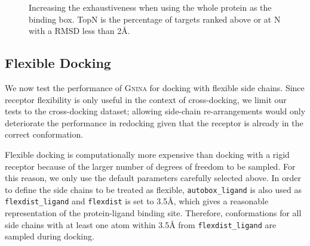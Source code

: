 \documentclass[linenumbers,doublespacing]{bmcart}
\begin{document}
\begin{figure}[tb]   
	\caption{Increasing the exhaustiveness when using the whole protein as the binding box. TopN is the percentage of targets ranked above or at N with a RMSD less than 2{\AA}.}
        \label{fig:WholeProteinExh}
\end{figure}

\subsection{Flexible Docking}

We now test the performance of \textsc{Gnina} for docking with flexible side chains. Since receptor flexibility is only useful in the context of cross-docking, we limit our tests to the cross-docking dataset; allowing side-chain re-arrangements would only deteriorate the performance in redocking given that the receptor is already in the correct conformation.

Flexible docking is computationally more expensive than docking with a rigid receptor because of the larger number of degrees of freedom to be sampled. For this reason, we only use the default parameters carefully selected above. In order to define the side chains to be treated as flexible, \texttt{autobox\_ligand} is also used as \texttt{flexdist\_ligand} and \texttt{flexdist} is set to 3.5{\AA}, which gives a reasonable representation of the protein-ligand binding site\cite{meli2020leraning}. Therefore, conformations for all side chains with at least one atom within 3.5{\AA} from \texttt{flexdist\_ligand} are sampled during docking.
\end{document}
